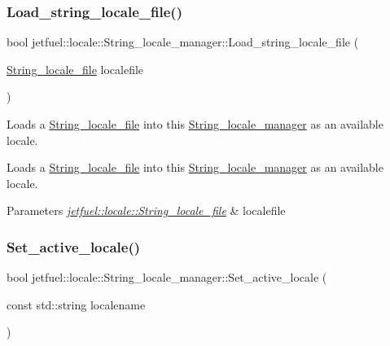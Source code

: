 \subsubsection{\texorpdfstring{Load\+\_\+string\+\_\+locale\+\_\+file()}{Load\_string\_locale\_file()}}
{\footnotesize\ttfamily bool jetfuel\+::locale\+::\+String\+\_\+locale\+\_\+manager\+::\+Load\+\_\+string\+\_\+locale\+\_\+file (\begin{DoxyParamCaption}\item[{\hyperlink{classjetfuel_1_1locale_1_1String__locale__file}{String\+\_\+locale\+\_\+file}}]{localefile }\end{DoxyParamCaption})\hspace{0.3cm}{\ttfamily [inline]}}



Loads a \hyperlink{classjetfuel_1_1locale_1_1String__locale__file}{String\+\_\+locale\+\_\+file} into this \hyperlink{classjetfuel_1_1locale_1_1String__locale__manager}{String\+\_\+locale\+\_\+manager} as an available locale. 

Loads a \hyperlink{classjetfuel_1_1locale_1_1String__locale__file}{String\+\_\+locale\+\_\+file} into this \hyperlink{classjetfuel_1_1locale_1_1String__locale__manager}{String\+\_\+locale\+\_\+manager} as an available locale.


\begin{DoxyParams}{Parameters}
{\em \hyperlink{classjetfuel_1_1locale_1_1String__locale__file}{jetfuel\+::locale\+::\+String\+\_\+locale\+\_\+file}} & localefile \\
\hline
\end{DoxyParams}
\mbox{\label{classjetfuel_1_1locale_1_1String__locale__manager_a2bca626efc214510e533a8c4ece7cafb}} 
\subsubsection{\texorpdfstring{Set\+\_\+active\+\_\+locale()}{Set\_active\_locale()}}
{\footnotesize\ttfamily bool jetfuel\+::locale\+::\+String\+\_\+locale\+\_\+manager\+::\+Set\+\_\+active\+\_\+locale (\begin{DoxyParamCaption}\item[{const std\+::string}]{localename }\end{DoxyParamCaption})\hspace{0.3cm}{\ttfamily [inline]}}



